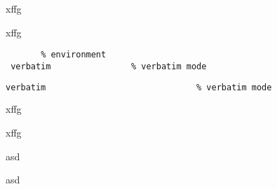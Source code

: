 \begin{verbatim56}       %
         xffg
\end{verbatim56}

\begin{verbatim=ab}      %
         xffg
\end{verbatim=ab}

\begin{lstlisting}       % environment
 verbatim                % verbatim mode
\end{lstlisting}

\begin{lstlisting}[frame=tb,           % environment, parameter in black
                   language=pascal]
 verbatim                              % verbatim mode
\end{lstlisting}

\begin{a}                %
         xffg
\end{a}

\begin{a*}               %
         xffg
\end{a*}

\begin{xyz}              %
asd
\end{xyz}

\begin{xyz*}
asd
\end{xyz*}


